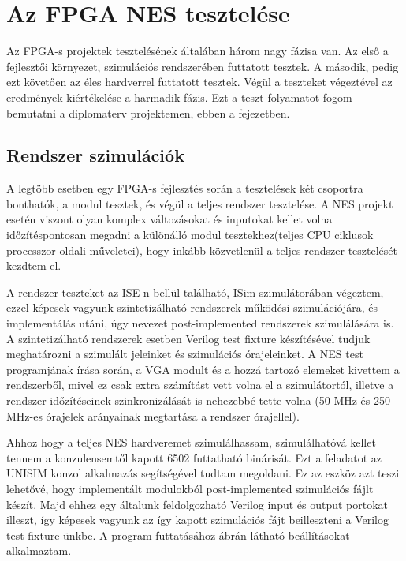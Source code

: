 \chapter{Az FPGA NES tesztelése}

Az FPGA-s projektek tesztelésének általában három nagy fázisa van. Az első a fejlesztői környezet, szimulációs rendszerében futtatott tesztek. A második, pedig ezt követően az éles hardverrel futtatott tesztek. Végül a teszteket végeztével az eredmények kiértékelése a harmadik fázis. Ezt a teszt folyamatot fogom bemutatni a diplomaterv projektemen, ebben a fejezetben.

\section{Rendszer szimulációk}

A legtöbb esetben egy FPGA-s fejlesztés során a tesztelések két csoportra bonthatók, a modul tesztek, és végül a teljes rendszer tesztelése. A NES projekt esetén viszont olyan komplex változásokat és inputokat kellet volna időzítéspontosan megadni a különálló modul tesztekhez(teljes CPU ciklusok processzor oldali műveletei), hogy inkább közvetlenül a teljes rendszer tesztelését kezdtem el.

A rendszer teszteket az ISE-n bellül található, ISim szimulátorában végeztem, ezzel képesek vagyunk szintetizálható rendszerek működési szimulációjára, és implementálás utáni, úgy nevezet post-implemented rendszerek szimulálására is. A szintetizálható rendszerek esetben Verilog test fixture készítésével tudjuk meghatározni a szimulált jeleinket és szimulációs órajeleinket. A NES test programjának írása során, a VGA modult és a hozzá tartozó elemeket kivettem a rendszerből, mivel ez csak extra számítást vett volna el a szimulátortól, illetve a rendszer időzítéseinek szinkronizálását is nehezebbé tette volna (50 MHz és 250 MHz-es órajelek arányainak megtartása a rendszer órajellel).

Ahhoz hogy a teljes NES hardveremet szimulálhassam, szimulálhatóvá kellet tennem a konzulensemtől kapott 6502 futtatható binárisát. Ezt a feladatot az UNISIM konzol alkalmazás segítségével tudtam megoldani. Ez az eszköz azt teszi lehetővé, hogy implementált modulokból post-implemented szimulációs fájlt készít. Majd ehhez egy általunk feldolgozható Verilog input és output portokat illeszt, így képesek vagyunk az így kapott szimulációs fájt beilleszteni a Verilog test fixture-ünkbe. A program futtatásához  ábrán látható beállításokat alkalmaztam.

